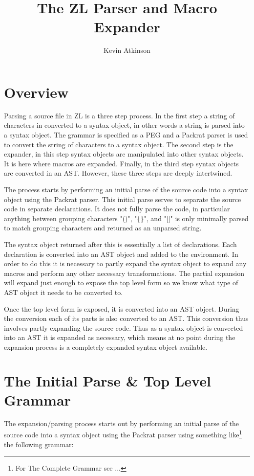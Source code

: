 \documentclass[12pt,english,letterpaper]{article}
\begin{document}
\title{The ZL Parser and Macro Expander}
\author{Kevin Atkinson}

\section{Overview}

Parsing a source file in ZL is a three step process.  In the first
step a string of characters in converted to a syntax object, in other
words a string is parsed into a syntax object.  The grammar is
specified as a PEG and a Packrat parser is used to convert the string of
characters to a syntax object.  The second step is the expander, in
this step syntax objects are manipulated into other syntax objects.
It is here where macros are expanded.  Finally, in the third step
syntax objects are converted in an AST.  However, these three steps
are deeply intertwined.

The process starts by performing an initial parse of the source code
into a syntax object using the Packrat parser.  This initial parse
serves to separate the source code in separate declarations.  It does
not fully parse the code, in particular anything between grouping
characters "()", "\{\}", and "[]" is only minimally parsed to match
grouping characters and returned as an unparsed string.

The syntax object returned after this is essentially a list of
declarations.  Each declaration is converted into an AST object and
added to the environment.  In order to do this it is necessary to partly
expand the syntax object to expand any macros and perform any other
necessary transformations.  The partial expansion will expand just
enough to expose the top level form so we know what type of AST object
it needs to be converted to.

Once the top level form is exposed, it is converted into an AST
object.  During the conversion each of its parts is also converted to
an AST.  This conversion thus involves partly expanding the source
code.  Thus as a syntax object is convected into an AST it is expanded
as necessary, which means at no point during the expansion process is
a completely expanded syntax object available.

\section{The Initial Parse \& Top Level Grammar}

The expansion/parsing process starts out by performing an initial
parse of the source code into a syntax object using the Packrat parser
using something like\footnote{For The Complete Grammar see ...} the
following grammar:
\end{document}
